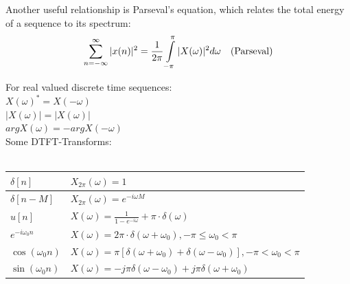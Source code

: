 Another useful relationship is Parseval’s equation, which relates the total energy of a sequence to its spectrum: 
\begin{align}
\sum_{n=-\infty}^{\infty} |x(n)|^2= \frac{1}{2\pi} \int\limits_{-\pi}^{\pi} |X(\omega)|^2 d\omega && \text{(Parseval)} \notag
\end{align}

For real valued discrete time sequences:\\
	$X(\omega)^* = X(-\omega)$ \\
	$|X(\omega)| = |X(\omega)|$\\
	$argX(\omega) = -argX(-\omega)$\\

Some DTFT-Transforms: \\ \\
\begin{tabularx}{0.7\textwidth}{|l|X|}
	\hline
	$\delta[n]$ &	$X_{2\pi}(\omega) = 1$ \\
	\hline 	
	$\delta[n-M]$ &	$X_{2\pi}(\omega) = e^{-i\omega M}$ \\
	\hline
	$u[n]$ & %
	$X(\omega) = \frac{1}{1-e^{-i \omega}} + \pi \cdot \delta (\omega) $ \\
	\hline
	$e^{-i \omega_0 n}$ &	$X(\omega) = 2\pi\cdot \delta (\omega +\omega_0),     -\pi \leq \omega_0 < \pi$ \\
	\hline
	$\cos(\omega_0 n) $ & $X(\omega) = \pi [\delta (\omega +\omega_0)+\delta (\omega -\omega_0)],     -\pi < \omega_0 < \pi $\\
	\hline
	$\sin(\omega_0 n) $ & $X(\omega) = -j \pi \delta(\omega - \omega_0) + j \pi \delta(\omega + \omega_0)$\\
	\hline
\end{tabularx} \\ \\

\newpage

